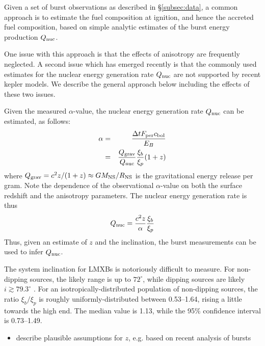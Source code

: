 \documentclass{aastex61}
\begin{document}
Given a set of burst observations as described in \S\ref{subsec:data}, a common approach \cite[e.g][]{falanga11} is to estimate the fuel composition at ignition, and hence the accreted fuel composition, based on simple analytic estimates of the burst energy production $Q_{\rm nuc}$.

One issue with this approach is that the effects of anisotropy are frequently neglected.
%
A second issue which has emerged recently is that the commonly used estimates for the nuclear energy generation rate $Q_{\rm nuc}$ are not supported by recent {\sc kepler} models. 
%
We describe the general approach below including the effects of these two issues.

Given the measured $\alpha$-value, the nuclear energy generation rate $Q_{\rm nuc}$ can be estimated, as follows:
\begin{eqnarray}
\alpha & = & \frac{\Delta t F_{\rm per} c_{\rm bol}}{E_B} \\
& = & \frac{Q_{\rm grav}}{Q_{\rm nuc}}\frac{\xi_b}{\xi_p}(1+z)
\end{eqnarray}
where $Q_{\rm grav} = c^2z/(1+z) \approx GM_{\rm NS}/R_{\rm NS}$ is the gravitational energy release per gram. Note the dependence of the observational $\alpha$-value on both the surface redshift and the anisotropy parameters. The nuclear energy generation rate is thus
\begin{equation}
Q_{\rm nuc} = \frac{c^2 z}{\alpha}\frac{\xi_b}{\xi_p} \label{qnuc}
\end{equation}
Thus, given an estimate of $z$ and the inclination, the burst measurements can be used to infer $Q_{\rm nuc}$. 

The system inclination for LMXBs is notoriously difficult to measure. For non-dipping sources, the likely range is up to $72^\circ$, while dipping sources are likely $i\gtrsim79.3^\circ$ \cite[]{gal16a}.
% 
For an isotropically-distributed population of non-dipping sources, the ratio $\xi_b/\xi_p$ is roughly uniformly-distributed between 0.53--1.64, rising a little towards the high end. The median value is 1.13, while the 95\% confidence interval is 0.73--1.49.

\begin{itemize}
\item describe plausible assumptions for $z$, e.g. based on recent analysis of bursts
\end{itemize}
\end{document}
